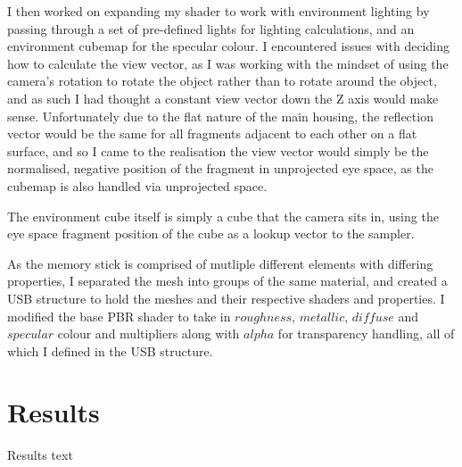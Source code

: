\documentclass[]{acmsiggraph}
\begin{document}
I then worked on expanding my shader to work with environment lighting by passing through a set of pre-defined lights for lighting calculations, and an environment cubemap for the specular colour.
I encountered issues with deciding how to calculate the view vector, as I was working with the mindset of using the camera's rotation to rotate the object rather than to rotate around the object, 
and as such I had thought a constant view vector down the Z axis would make sense.  Unfortunately due to the flat nature of the main housing, the reflection vector would be the same for all fragments 
adjacent to each other on a flat surface, and so I came to the realisation the view vector would simply be the normalised, negative position of the fragment in unprojected eye space, as the cubemap 
is also handled via unprojected space.

The environment cube itself is simply a cube that the camera sits in, using the eye space fragment position of the cube as a lookup vector to the sampler.

As the memory stick is comprised of mutliple different elements with differing properties, I separated the mesh into groups of the same material, and created a USB structure to hold the meshes and 
their respective shaders and properties.  I modified the base PBR shader to take in $roughness$, $metallic$, $diffuse$ and $specular$ colour and multipliers along with $alpha$ for transparency 
handling, all of which I defined in the USB structure.


\section{Results} \label{sec:Results}
Results text \cite{blenderSushi}



\end{document}

